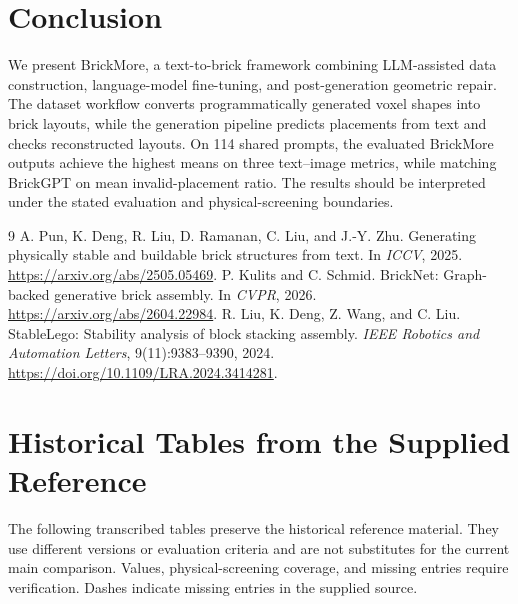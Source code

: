 \documentclass[10pt,twocolumn,letterpaper]{article}
\begin{document}
\section{Conclusion}
We present BrickMore, a text-to-brick framework combining LLM-assisted data construction, language-model fine-tuning, and post-generation geometric repair. The dataset workflow converts programmatically generated voxel shapes into brick layouts, while the generation pipeline predicts placements from text and checks reconstructed layouts. On 114 shared prompts, the evaluated BrickMore outputs achieve the highest means on three text--image metrics, while matching BrickGPT on mean invalid-placement ratio. The results should be interpreted under the stated evaluation and physical-screening boundaries.

\FloatBarrier
{\footnotesize
\begin{thebibliography}{9}
 A. Pun, K. Deng, R. Liu, D. Ramanan, C. Liu, and J.-Y. Zhu. Generating physically stable and buildable brick structures from text. In \emph{ICCV}, 2025. \url{https://arxiv.org/abs/2505.05469}.
 P. Kulits and C. Schmid. BrickNet: Graph-backed generative brick assembly. In \emph{CVPR}, 2026. \url{https://arxiv.org/abs/2604.22984}.
 R. Liu, K. Deng, Z. Wang, and C. Liu. StableLego: Stability analysis of block stacking assembly. \emph{IEEE Robotics and Automation Letters}, 9(11):9383--9390, 2024. \url{https://doi.org/10.1109/LRA.2024.3414281}.
\end{thebibliography}}
\clearpage
\onecolumn
\appendix
\section{Historical Tables from the Supplied Reference}
The following transcribed tables preserve the historical reference material. They use different versions or evaluation criteria and are not substitutes for the current main comparison. Values, physical-screening coverage, and missing entries require verification. Dashes indicate missing entries in the supplied source.

\end{document}

